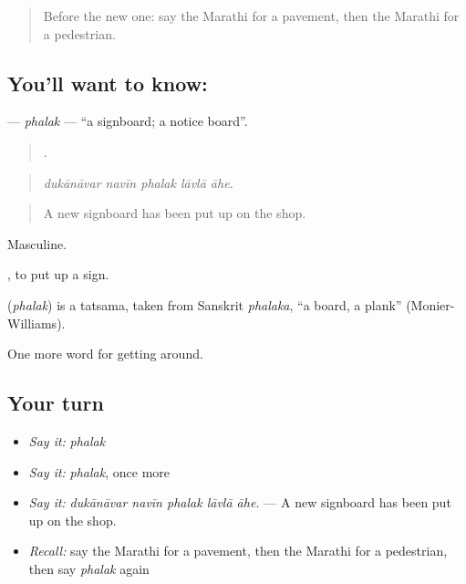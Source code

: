 \label{lesson:MR-C406-phalak}



\begin{quote}
Before the new one: say the Marathi for a pavement, then the Marathi for a pedestrian.
\end{quote}

\subsection*{You'll want to know: }
\textbf{} — \emph{phalak} — \textquotedblleft{}a signboard; a notice board\textquotedblright{}.

\begin{quote}
    .
\end{quote}

\begin{quote}
\emph{dukānāvar navīn phalak lāvlā āhe.}
\end{quote}

\begin{quote}
A new signboard has been put up on the shop.
\end{quote}

Masculine.

 , to put up a sign.

\begin{cousinweb}
\textbf{} (\emph{phalak}) is a tatsama, taken from Sanskrit \emph{phalaka}, \textquotedblleft{}a board, a plank\textquotedblright{} (Monier-Williams).
\end{cousinweb}

\begin{grammarlens}[title={What you've built}]
One more word for getting around.
\end{grammarlens}

\subsection*{Your turn}
\begin{itemize}
\raggedright
  \item \emph{Say it:} \emph{phalak}
  \item \emph{Say it:} \emph{phalak}, once more
  \item \emph{Say it:} \emph{dukānāvar navīn phalak lāvlā āhe.} — A new signboard has been put up on the shop.
  \item \emph{Recall:} say the Marathi for a pavement, then the Marathi for a pedestrian, then say \emph{phalak} again
\end{itemize}

